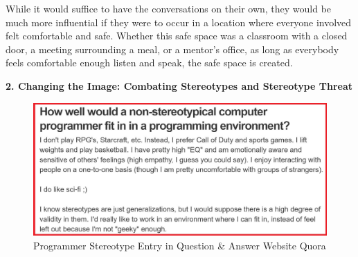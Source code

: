 \documentclass[12pt]{article}
\begin{document}
		While it would suffice to have the conversations on their own, they would be much more influential if they were to occur in a location where everyone involved felt comfortable and safe. Whether this safe space was a classroom with a closed door, a meeting surrounding a meal, or a mentor's office, as long as everybody feels comfortable enough listen and speak, the safe space is created.\\
	
		\pagebreak
		
	\textbf{2. Changing the Image: Combating Stereotypes and Stereotype Threat}\\
	
%		
%		


		\begin{figure}[H]
			\begin{center}
				\includegraphics[]{quora}
				\caption{Programmer Stereotype Entry in Question \& Answer Website Quora}
			\end{center}
		\end{figure}
		
\end{document}
